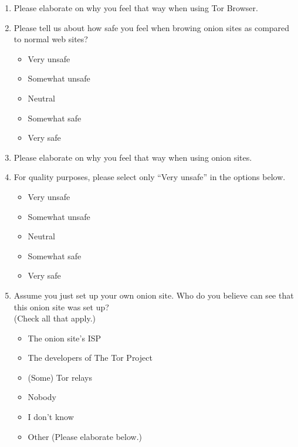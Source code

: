 \begin{enumerate}
    \item Please elaborate on why you feel that way when using Tor Browser.

    \item Please tell us about how safe you feel when browing onion sites as
        compared to normal web sites?
        \begin{itemize}[label=$\Circle$]
            \item Very unsafe
            \item Somewhat unsafe
            \item Neutral
            \item Somewhat safe
            \item Very safe
        \end{itemize}

    \item Please elaborate on why you feel that way when using onion sites.

    \item For quality purposes, please select only ``Very unsafe'' in the options
        below.
        \begin{itemize}[label=$\Circle$]
            \item Very unsafe
            \item Somewhat unsafe
            \item Neutral
            \item Somewhat safe
            \item Very safe
        \end{itemize}

    \item Assume you just set up your own onion site. Who do you believe can
        see that this onion site was set up?\\(Check all that apply.)
        \begin{itemize}[label=$\Square$]
            \item The onion site's ISP
            \item The developers of The Tor Project
            \item (Some) Tor relays
            \item Nobody
            \item I don't know
            \item Other (Please elaborate below.)
        \end{itemize}


\end{enumerate}
